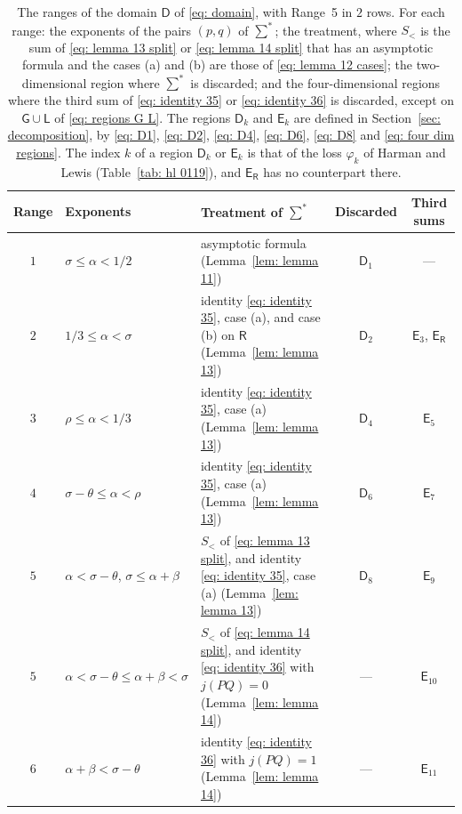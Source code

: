 \documentclass{article}
\numberwithin{equation}{section}
\newcommand{\Le}{\leqslant}
\begin{document}
\begin{table}[ht]
\centering
\small
\begin{tabular}{clp{6.4cm}cc}
\toprule
Range & Exponents & Treatment of $\sum^*$ & Discarded & Third sums \\
\midrule
$1$ & $\sigma \Le \alpha < 1/2$ & asymptotic formula (Lemma~\ref{lem: lemma 11}) & $\mathsf{D}_1$ & --- \\
$2$ & $1/3 \Le \alpha < \sigma$ & identity \eqref{eq: identity 35}, case (a), and case (b) on $\mathsf{R}$ (Lemma~\ref{lem: lemma 13}) & $\mathsf{D}_2$ & $\mathsf{E}_3$, $\mathsf{E}_{\mathsf{R}}$ \\
$3$ & $\rho \Le \alpha < 1/3$ & identity \eqref{eq: identity 35}, case (a) (Lemma~\ref{lem: lemma 13}) & $\mathsf{D}_4$ & $\mathsf{E}_5$ \\
$4$ & $\sigma - \theta \Le \alpha < \rho$ & identity \eqref{eq: identity 35}, case (a) (Lemma~\ref{lem: lemma 13}) & $\mathsf{D}_6$ & $\mathsf{E}_7$ \\
$5$ & $\alpha < \sigma - \theta$, $\sigma \Le \alpha + \beta$ & $S_<$ of \eqref{eq: lemma 13 split}, and identity \eqref{eq: identity 35}, case (a) (Lemma~\ref{lem: lemma 13}) & $\mathsf{D}_8$ & $\mathsf{E}_9$ \\
$5$ & $\alpha < \sigma - \theta \Le \alpha + \beta < \sigma$ & $S_<$ of \eqref{eq: lemma 14 split}, and identity \eqref{eq: identity 36} with $j(PQ) = 0$ (Lemma~\ref{lem: lemma 14}) & --- & $\mathsf{E}_{10}$ \\
$6$ & $\alpha + \beta < \sigma - \theta$ & identity \eqref{eq: identity 36} with $j(PQ) = 1$ (Lemma~\ref{lem: lemma 14}) & --- & $\mathsf{E}_{11}$ \\
\bottomrule
\end{tabular}
\caption{The ranges of the domain $\mathsf{D}$ of \eqref{eq: domain}, with Range~5 in $2$ rows. For each range: the exponents of the pairs $(p, q)$ of $\sum^*$; the treatment, where $S_<$ is the sum of \eqref{eq: lemma 13 split} or \eqref{eq: lemma 14 split} that has an asymptotic formula and the cases (a) and (b) are those of \eqref{eq: lemma 12 cases}; the two-dimensional region where $\sum^*$ is discarded; and the four-dimensional regions where the third sum of \eqref{eq: identity 35} or \eqref{eq: identity 36} is discarded, except on $\mathsf{G} \cup \mathsf{L}$ of \eqref{eq: regions G L}. The regions $\mathsf{D}_k$ and $\mathsf{E}_k$ are defined in Section~\ref{sec: decomposition}, by \eqref{eq: D1}, \eqref{eq: D2}, \eqref{eq: D4}, \eqref{eq: D6}, \eqref{eq: D8} and \eqref{eq: four dim regions}. The index $k$ of a region $\mathsf{D}_k$ or $\mathsf{E}_k$ is that of the loss $\varphi_k$ of Harman and Lewis (Table~\ref{tab: hl 0119}), and $\mathsf{E}_{\mathsf{R}}$ has no counterpart there.}
\label{tab: ranges}
\end{table}
\end{document}
